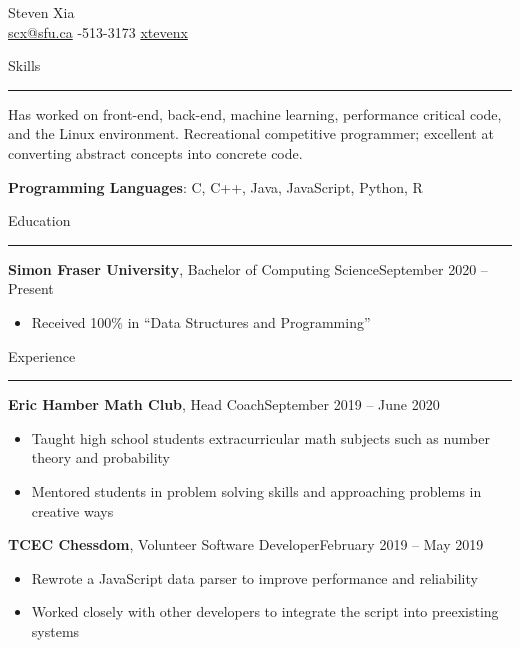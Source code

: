 \documentclass{article}
\newcommand{\entrytitle}[3]{\vspace{0.5em}\textbf{#1}, #2\hfill #3}
\renewcommand{\section}[1]{\vspace{0.5em}\Large{#1}\vspace{0.3em}\hrule\normalsize{}}
\newenvironment{entrybody}{\begin{itemize}[itemsep=0.3em]}{\end{itemize}}
\begin{document}
\pagestyle{empty}


\begin{center}
    \huge{Steven Xia} \\\vspace{0.5em}
    \normalsize{\faEnvelope\: \href{mailto:scx@sfu.ca}{scx@sfu.ca}} \qquad
    \normalsize{\faPhoneSquare*{}-513-3173} \qquad
    \normalsize{\faGithub\: \href{https://github.com/xtevenx}{xtevenx}}
\end{center}


\section{Skills} \vspace{0.5em}

Has worked on front-end, back-end, machine learning, performance critical code, and the Linux environment.
Recreational competitive programmer; excellent at converting abstract concepts into concrete code.
\vspace{-0.2em}

\textbf{Programming Languages}: C, C++, Java, JavaScript, Python, R


\section{Education}

\entrytitle{Simon Fraser University}{Bachelor of Computing Science}{September 2020 – Present}
\begin{entrybody}
\item Received 100\% in ``Data Structures and Programming''
\end{entrybody}


\section{Experience}

\entrytitle{Eric Hamber Math Club}{Head Coach}{September 2019 – June 2020}
\begin{entrybody}
\item Taught high school students extracurricular math subjects such as number theory and probability
\item Mentored students in problem solving skills and approaching problems in creative ways
\end{entrybody}

\entrytitle{TCEC Chessdom}{Volunteer Software Developer}{February 2019 – May 2019}
\begin{entrybody}
\item Rewrote a JavaScript data parser to improve performance and reliability
\item Worked closely with other developers to integrate the script into preexisting systems
\end{entrybody}
\end{document}
